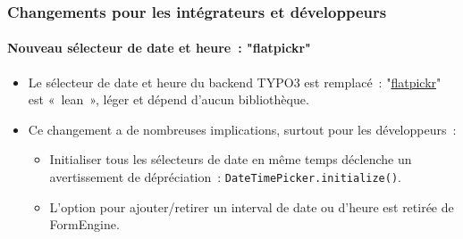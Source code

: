 %

\begin{frame}[fragile]
	\frametitle{Changements pour les intégrateurs et développeurs}
	\framesubtitle{Nouveau sélecteur de date et heure~: "flatpickr"}

	\lstset{basicstyle=\tiny\ttfamily}

	\begin{itemize}
		\item Le sélecteur de date et heure du backend TYPO3 est remplacé~:\newline
			"\href{https://flatpickr.js.org/}{flatpickr}"
			est «~lean~», léger et dépend d'aucun bibliothèque.
		\item Ce changement a de nombreuses implications, surtout pour les développeurs~:

			\begin{itemize}\small
				\item Initialiser tous les sélecteurs de date en même temps déclenche un avertissement de dépréciation~:\newline
					\texttt{DateTimePicker.initialize()}.
				\item L'option pour ajouter/retirer un interval de date ou d'heure est retirée de FormEngine.
			\end{itemize}

	\end{itemize}

\end{frame}

